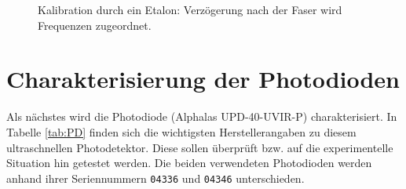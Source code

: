 \documentclass[bachelor,       %
               twoside,        %
               BCOR10mm,       %
               liststotoc,nomtotoc,bibtotoc, %
               english,ngerman, %
               final,          %
               ]{GAUBM}
\begin{document}
 \begin{figure}[!htb]
   \centering
   \hfill
   \hfill
   \caption{Kalibration durch ein Etalon: Verzögerung nach der Faser wird Frequenzen zugeordnet.}
   \label{fig:caliEtalon}
 \end{figure}

\section{Charakterisierung der Photodioden}
Als nächstes wird die Photodiode (Alphalas UPD-40-UVIR-P) charakterisiert.
In Tabelle \ref{tab:PD} finden sich die wichtigsten Herstellerangaben zu diesem ultraschnellen Photodetektor.
Diese sollen überprüft bzw. auf die experimentelle Situation hin getestet werden.
Die beiden verwendeten Photodioden werden anhand ihrer Seriennummern \texttt{04336} und \texttt{04346} unterschieden.
\end{document}
